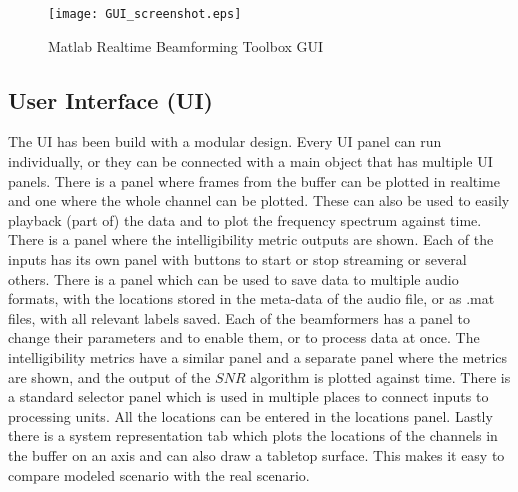 \begin{figure} [h]
    \centering
       \texttt{[image: GUI\_screenshot.eps]} %
    \caption[User interface implemented in \matlab]{Matlab Realtime Beamforming Toolbox GUI}
    \label{fig:GUI}
\end{figure}

\subsection{User Interface (UI)}
\label{sec:des_realtime}
The UI has been build with a modular design. Every UI panel can run individually, or they can be connected with a main object that has multiple UI panels. There is a panel where frames from the buffer can be plotted in realtime and one where the whole channel can be plotted. These can also be used to easily playback (part of) the data and to plot the frequency spectrum against time. There is a panel where the intelligibility metric outputs are shown. Each of the inputs has its own panel with buttons to start or stop streaming or several others. There is a panel which can be used to save data to multiple audio formats, with the locations stored in the meta-data of the audio file, or as \matlab .mat files, with all relevant labels saved. Each of the beamformers has a panel to change their parameters and to enable them, or to process data at once. The intelligibility metrics have a similar panel and a separate panel where the metrics are shown, and the output of the $SNR$ algorithm is plotted against time. There is a standard selector panel which is used in multiple places to connect inputs to processing units. All the locations can be entered in the locations panel. Lastly there is a system representation tab which plots the locations of the channels in the buffer on an axis and can also draw a tabletop surface. This makes it easy to compare modeled scenario with the real scenario.

